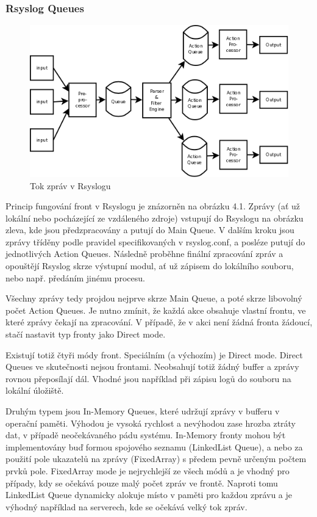 \documentclass[thesis=B,czech]{FITthesis}[2012/06/26]
\begin{document}
\subsubsection*{Rsyslog Queues}
\begin{figure}[ht]
	\centering
	\includegraphics[scale=0.4]{images/rsyslog-queues}
	\caption[Tok zpráv v Rsyslogu]{Tok zpráv v Rsyslogu~\cite{RsyslogQueues}}
\end{figure}

Princip fungování front v Rsyslogu je znázorněn na obrázku 4.1. Zprávy (ať už lokální nebo pocházející ze vzdáleného zdroje) vstupují do Rsyslogu  na obrázku zleva, kde jsou předzpracovány a putují do Main Queue. V dalším kroku jsou zprávy tříděny podle pravidel specifikovaných v rsyslog.conf, a posléze putují do jednotlivých Action Queues. Následně proběhne finální zpracování zpráv a opouštějí Rsyslog skrze výstupní modul, ať už zápisem do lokálního souboru, nebo např. předáním jinému procesu.

Všechny zprávy tedy projdou nejprve skrze Main Queue, a poté skrze libovolný počet Action Queues. Je nutno zmínit, že každá akce obsahuje vlastní frontu, ve které zprávy čekají na zpracování. V případě, že v akci není žádná fronta žádoucí, stačí nastavit typ fronty jako Direct mode.

Existují totiž čtyři módy front. Speciálním (a výchozím) je Direct mode. Direct Queues ve skutečnosti nejsou frontami. Neobsahují totiž žádný buffer a zprávy rovnou přeposílají dál. Vhodné jsou například při zápisu logů do souboru na lokální úložiště.

Druhým typem jsou In-Memory Queues, které udržují zprávy v bufferu v operační paměti. Výhodou je vysoká rychlost a nevýhodou zase hrozba ztráty dat, v případě neočekávaného pádu systému.
In-Memory fronty mohou být implementovány buď formou spojového seznamu (LinkedList Queue), a nebo za použití pole ukazatelů na zprávy (FixedArray) s předem pevně určeným počtem prvků pole. FixedArray mode je nejrychlejší ze všech módů a je vhodný pro případy, kdy se očekává pouze malý počet zpráv ve frontě. Naproti tomu LinkedList Queue dynamicky alokuje místo v paměti pro každou zprávu a je výhodný například na serverech, kde se očekává velký tok zpráv.
\end{document}
